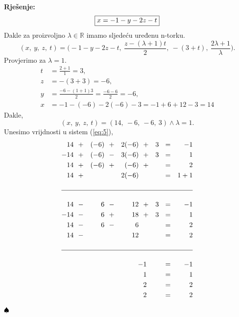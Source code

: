 \documentclass{article}
\newenvironment{solution}{\noindent\textbf{Rje\v senje:\newline}}{$\hfill\spadesuit$}
\begin{document}
\begin{solution}
\begin{equation*}
\begin{aligned}
                    \Aboxed{x&=-1-y-2z-t} \\
        \end{aligned}
    \end{equation*}
    Dakle za proizvoljno $\lambda\in\mathbb{R}$ imamo sljede\' cu uređenu n-torku.
    $$(x,\ y,\ z,\ t)=\biggl(-1-y-2z-t,\ \frac{z-(\lambda +1)t}{2},\ -(3+t),\ \frac{2\lambda +1}{\lambda}\biggr).$$
    Provjerimo za $\lambda =1$. \\
    \begin{equation*}
        \begin{aligned}
            \boxed{t}&=\frac{2+1}{1}=\boxed{3}, \\
            \boxed{z}&=-(3+3)=\boxed{-6}, \\
            \boxed{y}&=\frac{-6-(1+1)3}{2}=\frac{-6-6}{2}=\boxed{-6}, \\
            \boxed{x}&=-1-(-6)-2(-6)-3=-1+6+12-3=\boxed{14}
        \end{aligned}
    \end{equation*}
    Dakle,
    $$(x,\ y,\ z,\ t)=(14,\ -6,\ -6,\ 3)\land\lambda =1.$$
    Unesimo vrijdnosti u sistem (\ref{eq:5}),
    \begin{equation*}
        \begin{aligned}
            14\ \ &+&(-6)\ \ &+&2(-6)\ \ &+&3&\ \ =&-1 \\
            -14\ \ &+&(-6)\ \ &-&3(-6)\ \ &+&3&\ \ =&1 \\
             14\ \ &+&(-6)\ \ &+& (-6)\ \ &+& &\ \ =&2 \\
             14\ \ &+& \ \ & &2(-6)\ \ & & &\ \ =&1+1 \\\\
             \hline\\
             14\ \ &-&6\ \ &-&12\ \ &+&3&\ \ =&-1 \\
            -14\ \ &-&6\ \ &+&18\ \ &+&3&\ \ =&1 \\
             14\ \ &-&6\ \ &-&6\ \ && &\ \ =&2 \\
             14\ \ &-& \ \ & &12\ \ & & &\ \ =&2 \\\\
             \hline\\
             \ \ & & \ \ & & \ \ -&1& &\ \ =&-1 \\
             \ \ & & \ \ & & \ \ &1& &\ \ =&1 \\
             \ \ & & \ \ & & \ \ &2& &\ \ =&2 \\
             \ \ & & \ \ & & \ \ &2& &\ \ =&2 \\
            \end{aligned}
        \end{equation*}
        
\end{solution}
\end{document}

